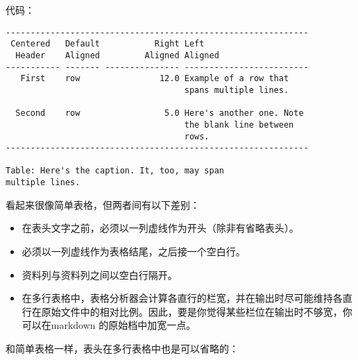 \documentclass[fancyhdr,bookmark]{ctexbook}
\providecommand{\tightlist}{%
  \setlength{\itemsep}{0pt}\setlength{\parskip}{0pt}}
\begin{document}
代码：

\begin{lstlisting}
-------------------------------------------------------------
 Centered   Default           Right Left
  Header    Aligned         Aligned Aligned
----------- ------- --------------- -------------------------
   First    row                12.0 Example of a row that
                                    spans multiple lines.

  Second    row                 5.0 Here's another one. Note
                                    the blank line between
                                    rows.
-------------------------------------------------------------

Table: Here's the caption. It, too, may span
multiple lines.
\end{lstlisting}

看起来很像简单表格，但两者间有以下差别：

\begin{itemize}
\tightlist
\item
  在表头文字之前，必须以一列虚线作为开头（除非有省略表头）。
\item
  必须以一列虚线作为表格结尾，之后接一个空白行。
\item
  资料列与资料列之间以空白行隔开。
\item
  在多行表格中，表格分析器会计算各直行的栏宽，并在输出时尽可能维持各直行在原始文件中的相对比例。因此，要是你觉得某些栏位在输出时不够宽，你可以在markdown
  的原始档中加宽一点。
\end{itemize}

和简单表格一样，表头在多行表格中也是可以省略的：
\end{document}
